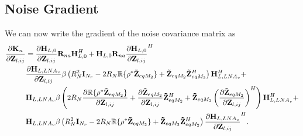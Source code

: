 \subsection{Noise Gradient}
We can now write the gradient of the noise covariance matrix as
\begin{align}
\label{eq:noise_cov}\nonumber
\frac{\partial\mat{K}_n}{\partial\mat{Z}_{l,ij}} &= 
\frac{\partial\mat{H}_{L,0}}{\partial\mat{Z}_{l,ij}}\mat{R}_{na}\mat{H}_{L,0}^H +\mat{H}_{L,0}\mat{R}_{na} \frac{\partial\mat{H}_{L,0}}{\partial\mat{Z}_{l,ij}}^H
\\\nonumber
&\frac{\partial\mat{H}_{L,LNA_v}}{\partial\mat{Z}_{l,ij}}\beta\left(R_N^2\mat{I}_{N_r} - 2 R_N\mathbb{R}\{\rho^*\mat{\tilde{Z}}_{eqM_2}\} + \mat{\tilde{Z}}_{eqM_2}\mat{\tilde{Z}}_{eqM_2}^H\right)\mat{H}_{L,LNA_v}^H+
\\\nonumber
&\mat{H}_{L,LNA_v}\beta\left(2 R_N\frac{\partial\mathbb{R}\{\rho^*\mat{\tilde{Z}}_{eqM_2}\}}{\partial\mat{Z}_{l,ij}} +
\frac{\partial\mat{\tilde{Z}}_{eqM_2}}{\partial\mat{Z}_{l,ij}}\mat{\tilde{Z}}_{eqM_2}^H + \mat{\tilde{Z}}_{eqM_2}\left(\frac{\partial\mat{\tilde{Z}}_{eqM_2}}{\partial\mat{Z}_{l,ij}}\right)^H\right)\mat{H}_{L,LNA_v}^H+\\
&\mat{H}_{L,LNA_v}\beta\left(R_N^2\mat{I}_{N_r} - 2 R_N\mathbb{R}\{\rho^*\mat{\tilde{Z}}_{eqM_2}\} + \mat{\tilde{Z}}_{eqM_2}\mat{\tilde{Z}}_{eqM_2}^H\right)\frac{\partial\mat{H}_{L,LNA_v}}{\partial\mat{Z}_{l,ij}}^H.%
\end{align}

